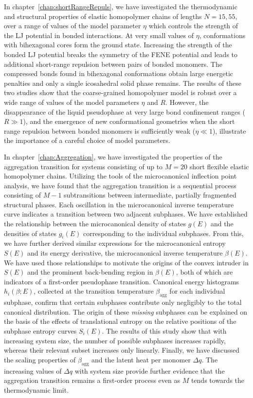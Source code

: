 \documentclass[12pt]{report}
\begin{document}
%
In chapter~\ref{chap:shortRangeRepuls}, we have investigated the thermodynamic and structural properties of elastic homopolymer chains of lengths $N=15,55$, over a range of values of the model parameter $\eta$  which controls the strength of the LJ potential in bonded interactions. At very small values of $\eta$, conformations with bihexagonal cores form the ground state. Increasing the strength of the bonded LJ potential breaks the symmetry of the FENE potential and leads to additional short-range repulsion between pairs of bonded monomers. The compressed bonds found in bihexagonal conformations obtain large energetic penalties and only a single icosahedral solid phase remains. The results of these two studies show that the coarse-grained homopolymer model is robust over a wide range of values of the model parameters $\eta$ and $R$. However, the disappearance of the liquid pseudophase at very large bond confinement ranges ($R\gg 1$), and the emergence of new conformational geometries when the short range repulsion between bonded monomers is sufficiently weak ($\eta \ll 1$), illustrate the importance of a careful choice of model parameters.
%


%
In chapter~\ref{chap:Aggregation}, we have investigated the properties of the aggregation transition for systems consisting of up to $M = 20$ short flexible elastic homopolymer chains. Utilizing the tools of the microcanonical inflection point analysis, we have found that the aggregation transition is a sequential process consisting of $M-1$ subtransitions between intermediate, partially fragmented structural phases. Each oscillation in the microcanonical inverse temperature curve indicates a transition between two adjacent subphases. We have established the relationship between the microcanonical density of states $g(E)$ and the densities of states $g_{i}(E)$ corresponding to the individual subphases. From this, we have further derived similar expressions for the microcanonical entropy $S(E)$ and its energy derivative, the microcanonical inverse temperature $\beta(E)$. We have used those relationships to motivate the origins of the convex intruder in $S(E)$ and the prominent back-bending region in $\beta(E)$, both of which are indicators of a first-order pseudophase transition. Canonical energy histograms $h_{i}(\beta;E)$, collected at the transition temperature $\beta_{\mathrm{agg}}$ for each individual subphase, confirm that certain subphases contribute only negligibly to the total canonical distribution. The origin of these \textit{missing} subphases can be explained on the basis of the effects of translational entropy on the relative positions of the subphase entropy curves $S_{i}(E)$. The results of this study show that with increasing system size, the number of possible subphases increases rapidly, whereas their relevant subset increases only linearly. Finally, we have discussed the scaling properties of $\beta_{\mathrm{agg}}$ and the latent heat per monomer $\Delta q$. The increasing values of $\Delta q$ with system size provide further evidence that the aggregation transition remains a first-order process even as $M$ tends towards the thermodynamic limit. 
%

\newpage

\begin{thebibliography}{99}
        
\end{thebibliography}
\end{document}
